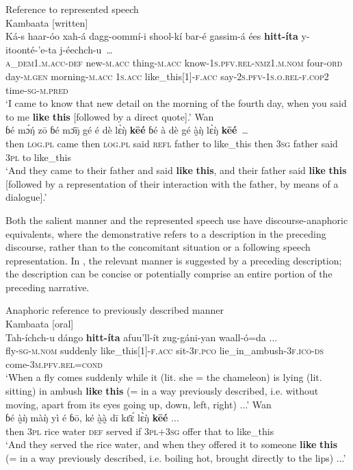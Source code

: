\documentclass[output=paper,colorlinks,citecolor=brown]{langscibook}
\begin{document}
\ea\label{ex:nikitina:3} {Reference to represented speech}\\
\ea\label{ex:nikitina:3a} {Kambaata [written]}\\
\gll Ká-s haar-óo xah-á dagg-oommí-i shool-kí bar-é gassim-á ées \textbf{hitt-íta} y-itoonté-’e-ta j-éechch-u~…\\
     \textsc{a\_dem1.m.acc-def} new-\textsc{m.acc} thing-\textsc{m.acc} know-\textsc{1s.pfv.rel-nmz1.m.nom} four-\textsc{ord} day-\textsc{m.gen} morning-\textsc{m.acc} 1\textsc{s.acc} like\_this[1]-\textsc{f.acc} say-\textsc{2s.pfv}{}-\textsc{1s.o.rel}{}-\textsc{f.cop2} time-\textsc{sg}{}-\textsc{m.pred}\\
\glt ‘I came to know that new detail on the morning of the fourth day, when you said to me \textbf{like} \textbf{this} [followed by a direct quote].’ 
\ex\label{ex:nikitina:3b} {Wan}\\
\gll ɓé m\'{ɔ}\'{ŋ} zō ɓé m\={ɔ}\={ŋ} gé é dè l\`{ɛ}\`{ŋ} \textbf{kēé} ɓé à dè gé à̰\`{ŋ} l\`{ɛ}\`{ŋ} \textbf{kēé}~…\\
     then \textsc{log.pl} came then \textsc{log.pl} said \textsc{refl} father to like\_this then \textsc{3sg} father said \textsc{3pl} to like\_this\\
\glt ‘And they came to their father and said \textbf{like} \textbf{this}, and their father said \textbf{like} \textbf{this} [followed by a representation of their interaction with the father, by means of a dialogue].’
\z
\z

Both the salient manner and the represented speech use have discourse-anaphoric equivalents, where the demonstrative refers to a description in the preceding discourse, rather than to the concomitant situation or a following speech representation. In , the relevant manner is suggested by a preceding description; the description can be concise or potentially comprise an entire portion of the preceding narrative.

\ea\label{ex:nikitina:4} {Anaphoric reference to previously described manner}\\
\ea\label{ex:nikitina:4a} {Kambaata [oral]}\\
\gll Tah-íchch-u dángo \textbf{hitt-íta} afuu’ll-ít zug-gáni-yan waall-ó=da ...\\
     fly-\textsc{sg-m.nom} suddenly like\_this[1]\textsc{{}-f.acc} sit-\textsc{3f.pco} lie\_in\_ambush-\textsc{3f.ico-ds} come-\textsc{3m.pfv.rel=cond}\\
\glt ‘When a fly comes suddenly while it (lit. she = the chameleon) is lying (lit. sitting) in ambush \textbf{like} \textbf{this} (= in a way previously described, i.e. without moving, apart from its eyes going up, down, left, right) ...’
\ex\label{ex:nikitina:4b} {Wan}\\
\gll ɓé à̰\`{ŋ} mà\`{ŋ} yì é ɓō, ké à̰à̰ dī k\={ɛ}\'{ɛ} l\`{ɛ}\`{ŋ} \textbf{kēé} ...\\
     then \textsc{3pl} rice water \textsc{def} served if \textsc{3pl+3sg} offer that to like\_this\\
\glt ‘And they served the rice water, and when they offered it to someone \textbf{like} \textbf{this} (= in a way previously described, i.e. boiling hot, brought directly to the lips) ...’
\z
\z
\end{document}
